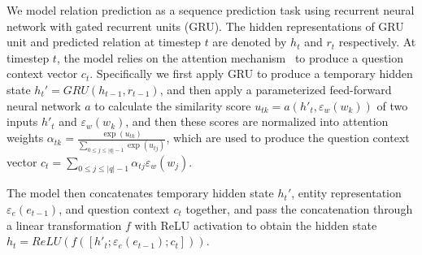 

We model relation prediction as a sequence prediction task using recurrent neural network with gated recurrent units (GRU). The hidden representations of GRU unit and predicted relation at timestep $t$ are denoted by $h_t$ and $r_t$ respectively. At timestep $t$, the model relies on the attention mechanism~\cite{DBLP:journals/corr/BahdanauCB14} to produce a question context vector $c_t$. Specifically we first apply GRU to produce a temporary hidden state  $h_{t}'=GRU(h_{t-1}, r_{t-1})$, and then apply a parameterized feed-forward neural network $a$ to calculate the similarity score $u_{tk} = a(h'_{t},\varepsilon_w(w_k))$ of two inputs $h'_{t}$ and $\varepsilon_w(w_k)$,  and then these scores are normalized into attention weights $\alpha_{tk}=\frac{\exp (u_{tk})}{\sum_{0\leq j\leq |q|-1}\exp (u_{tj})}$, which are used to produce the question context vector $c_t=\sum_{0\leq j\leq |q|-1}\alpha_{tj}\varepsilon_w(w_j)$. 


The model then concatenates temporary hidden state $h_{t}'$, entity representation $\varepsilon_e(e_{t-1})$, and question context $c_t$ together, and pass the concatenation through a linear transformation $f$ with ReLU activation to obtain the hidden state $h_t=ReLU(f([h'_{t}; \varepsilon_e(e_{t-1}); c_t]))$. 


